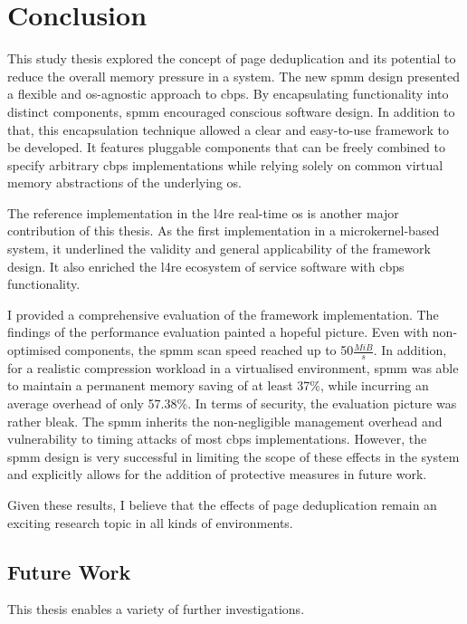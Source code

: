 \chapter{Conclusion}
\label{chap:conclusion}

This study thesis explored the concept of page deduplication and its potential to reduce the overall memory pressure in a system.
The new \ac{spmm} design presented a flexible and \ac{os}-agnostic approach to \acl{cbps}.
By encapsulating functionality into distinct components, \ac{spmm} encouraged conscious software design.
In addition to that, this encapsulation technique allowed a clear and easy-to-use framework to be developed.
It features pluggable components that can be freely combined to specify arbitrary \ac{cbps} implementations while relying solely on common virtual memory abstractions of the underlying \ac{os}.

The reference implementation in the \ac{l4re} real-time \ac{os} is another major contribution of this thesis.
As the first implementation in a microkernel-based system, it underlined the validity and general applicability of the framework design.
It also enriched the \ac{l4re} ecosystem of service software with \ac{cbps} functionality.

I provided a comprehensive evaluation of the framework implementation.
The findings of the performance evaluation painted a hopeful picture.
Even with non-optimised components, the \ac{spmm} scan speed reached up to 50$\frac{MiB}{s}$.
In addition, for a realistic compression workload in a virtualised environment, \ac{spmm} was able to maintain a permanent memory saving of at least 37\%, while incurring an average overhead of only 57.38\%.
In terms of security, the evaluation picture was rather bleak.
The \ac{spmm} inherits the non-negligible management overhead and vulnerability to timing attacks of most \ac{cbps} implementations.
However, the \ac{spmm} design is very successful in limiting the scope of these effects in the system and explicitly allows for the addition of protective measures in future work.

Given these results, I believe that the effects of page deduplication remain an exciting research topic in all kinds of environments.

\section{Future Work}
\label{sec:future-work}

This thesis enables a variety of further investigations.


